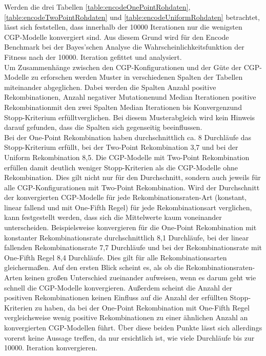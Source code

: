 Werden die drei Tabellen \ref{table:encodeOnePointRohdaten}, \ref{table:encodeTwoPointRohdaten} und \ref{table:encodeUniformRohdaten} betrachtet, lässt sich feststellen, dass innerhalb der 10000 Iterationen nur die wenigsten CGP-Modelle konvergiert sind.
Aus diesem Grund wird für den Encode Benchmark bei der Bayes'schen Analyse die Wahrscheinlichkeitsfunktion der Fitness nach der 10000. Iteration gefittet und analysiert.\\
Um Zusammenhänge zwischen den CGP-Konfigurationen und der Güte der CGP-Modelle zu erforschen werden Muster in verschiedenen Spalten der Tabellen miteinander abgeglichen.
Dabei werden die Spalten \glqq Anzahl positive Rekombinationen\grqq, \glqq Anzahl negativer Mutationen\grqq\space und \glqq Median Iterationen positive Rekombination\grqq\space mit den zwei Spalten \glqq Median Iterationen bis Konvergenz\grqq\space und \glqq Stopp-Kriterium erfüllt\grqq\space verglichen.
Bei diesem Musterabgleich wird kein Hinweis darauf gefunden, dass die Spalten sich gegenseitig beeinflussen.\\
Bei der One-Point Rekombination haben durchschnittlich ca. 8 Durchläufe das Stopp-Kri\-te\-rium erfüllt, bei der Two-Point Rekombination 3,7 und bei der Uniform Rekombination 8,5. 
Die CGP-Modelle mit Two-Point Rekombination erfüllen damit deutlich weniger Stopp-Kriterien als die CGP-Modelle ohne Rekombination.
Dies gilt nicht nur für den Durchschnitt, sondern auch jeweils für alle CGP-Konfigurationen mit Two-Point Rekombination.
Wird der Durchschnitt der konvergierten CGP-Modelle für jede Re\-kom\-bi\-na\-tions\-ra\-ten-Art (konstant, linear fallend und mit One-Fifth Regel) für jede Rekombinationsart verglichen, kann festgestellt werden, dass sich die Mittelwerte kaum voneinander unterscheiden.
Beispielsweise konvergieren für die One-Point Rekombination mit konstanter Rekombinationsrate durchschnittlich 8,1 Durchläufe, bei der linear fallenden Rekombinationsrate 7,7 Durchläufe und bei der Rekombinationsrate mit One-Fifth Regel 8,4 Durchläufe. 
Dies gilt für alle Rekombinationsarten gleichermaßen.
Auf den ersten Blick scheint es, als ob die Rekombinationsraten-Arten keinen großen Unterschied zueinander aufweisen, wenn es darum geht wie schnell die CGP-Modelle konvergieren.
Außerdem scheint die Anzahl der positiven Rekombinationen keinen Einfluss auf die Anzahl der erfüllten Stopp-Kriterien zu haben, da bei der One-Point Rekombination mit One-Fifth Regel vergleichsweise wenig positive Rekombinationen zu einer ähnlichen Anzahl an konvergierten CGP-Modellen führt.
Über diese beiden Punkte lässt sich allerdings vorerst keine Aussage treffen, da nur ersichtlich ist, wie viele Durchläufe bis zur 10000. Iteration konvergieren.
